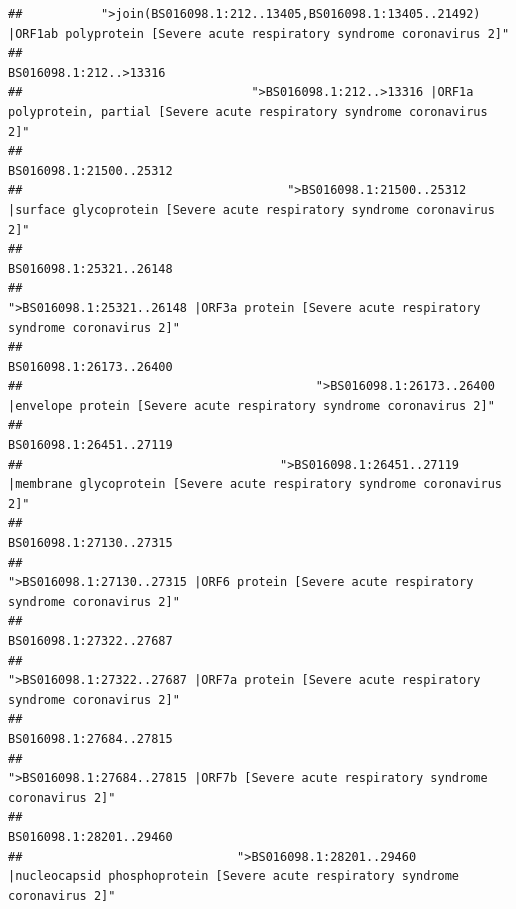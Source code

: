 \documentclass[
]{article}
\begin{document}
\begin{verbatim}
##           ">join(BS016098.1:212..13405,BS016098.1:13405..21492) |ORF1ab polyprotein [Severe acute respiratory syndrome coronavirus 2]" 
##                                                                                                                 BS016098.1:212..>13316 
##                                ">BS016098.1:212..>13316 |ORF1a polyprotein, partial [Severe acute respiratory syndrome coronavirus 2]" 
##                                                                                                                BS016098.1:21500..25312 
##                                     ">BS016098.1:21500..25312 |surface glycoprotein [Severe acute respiratory syndrome coronavirus 2]" 
##                                                                                                                BS016098.1:25321..26148 
##                                            ">BS016098.1:25321..26148 |ORF3a protein [Severe acute respiratory syndrome coronavirus 2]" 
##                                                                                                                BS016098.1:26173..26400 
##                                         ">BS016098.1:26173..26400 |envelope protein [Severe acute respiratory syndrome coronavirus 2]" 
##                                                                                                                BS016098.1:26451..27119 
##                                    ">BS016098.1:26451..27119 |membrane glycoprotein [Severe acute respiratory syndrome coronavirus 2]" 
##                                                                                                                BS016098.1:27130..27315 
##                                             ">BS016098.1:27130..27315 |ORF6 protein [Severe acute respiratory syndrome coronavirus 2]" 
##                                                                                                                BS016098.1:27322..27687 
##                                            ">BS016098.1:27322..27687 |ORF7a protein [Severe acute respiratory syndrome coronavirus 2]" 
##                                                                                                                BS016098.1:27684..27815 
##                                                    ">BS016098.1:27684..27815 |ORF7b [Severe acute respiratory syndrome coronavirus 2]" 
##                                                                                                                BS016098.1:28201..29460 
##                              ">BS016098.1:28201..29460 |nucleocapsid phosphoprotein [Severe acute respiratory syndrome coronavirus 2]" 

\end{verbatim}
\end{document}
